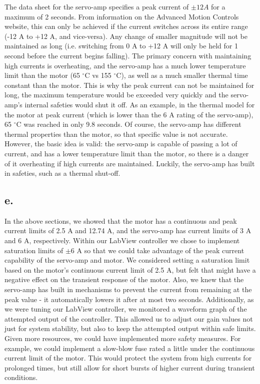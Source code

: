 \documentclass{article}
\theoremstyle{plain}
\theoremstyle{definition}
\theoremstyle{remark}
\begin{document}
The data sheet for the servo-amp specifies a peak current of $\pm12 A$ for a maximum of 2 seconds. From information on the Advanced Motion Controls website, this can only be achieved if the current switches across its entire range (-12 A to +12 A, and vice-versa). Any change of smaller magnitude will not be maintained as long (i.e. switching from 0 A to +12 A will only be held for 1 second before the current begins falling). The primary concern with maintaining high currents is overheating, and the servo-amp has a much lower temperature limit than the motor (65 $^\circ$C vs 155 $^\circ$C), as well as a much smaller thermal time constant than the motor.  This is why the peak current can not be maintained for long, the maximum temperature would be exceeded very quickly and the servo-amp's internal safeties would shut it off. As an example, in the thermal model for the motor at peak current (which is lower than the 6 A rating of the servo-amp), 65 $^\circ$C was reached in only 9.8 seconds. Of course, the servo-amp has different thermal properties than the motor, so that specific value is not accurate. However, the basic idea is valid: the servo-amp is capable of passing a lot of current, and has a lower temperature limit than the motor, so there is a danger of it overheating if high currents are maintained. Luckily, the servo-amp has built in safeties, such as a thermal shut-off.  \\

\subsection*{e.}
In the above sections, we showed that the motor has a continuous and peak current limits of 2.5 A and 12.74 A, and the servo-amp  has current limits of 3 A and 6 A, respectively. Within our LabView controller we chose to implement saturation limits of $\pm6$ A so that we could take advantage of the peak current capability of the servo-amp and motor. We considered setting a saturation limit based on the motor's continuous current limit of 2.5 A, but felt that might have a negative effect on the transient response of the motor. Also, we knew that the servo-amp has built in mechanisms to prevent the current from remaining at the peak value - it automatically lowers it after at most two seconds. Additionally, as we were tuning our LabView controller, we monitored a waveform graph of the attempted output of the controller. This allowed us to adjust our gain values not just for system stability, but also to keep the attempted output within safe limits. Given more resources, we could have implemented more safety measures. For example, we could implement a slow-blow fuse rated a little under the continuous current limit of the motor. This would protect the system from high currents for prolonged times, but still allow for short bursts of higher current during transient conditions.\\
\end{document}
